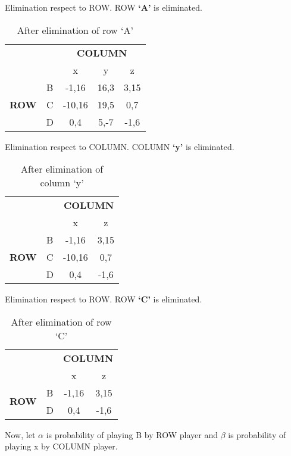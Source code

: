 \documentclass[a4paper,12pt]{article}
\begin{document}
\begin{enumerate}
Elimination respect to ROW. ROW \textbf{`A'} is eliminated.

\begin{table}[h]
\centering
\begin{tabular}{@{}ccccc@{}}
\toprule
\multicolumn{2}{c}{} & \multicolumn{3}{c}{\bfseries COLUMN}\\
\multicolumn{2}{c}{} & x & y & z\\
\multirow{3}{*}{\bfseries ROW} & B & -1,16 & 16,3 & 3,15\\
 & C & -10,16 & 19,5 & 0,7\\
 & D & 0,4 & 5,-7 & -1,6\\
 \bottomrule
\end{tabular}
\caption{After elimination of row `A'}
\end{table}

Elimination respect to COLUMN. COLUMN \textbf{`y'} is eliminated.

\begin{table}[H]
\centering
\begin{tabular}{@{}cccc@{}}
\toprule
\multicolumn{2}{c}{} & \multicolumn{2}{c}{\bfseries COLUMN}\\
\multicolumn{2}{c}{} & x & z\\
\multirow{3}{*}{\bfseries ROW} & B & -1,16 & 3,15\\
 & C & -10,16 & 0,7\\
 & D & 0,4 & -1,6\\
 \bottomrule
\end{tabular}
\caption{After elimination of column `y'}
\end{table}

Elimination respect to ROW. ROW \textbf{`C'} is eliminated.

\begin{table}[H]
\centering
\begin{tabular}{@{}cccc@{}}
\toprule
\multicolumn{2}{c}{} & \multicolumn{2}{c}{\bfseries COLUMN}\\
\multicolumn{2}{c}{} & x & z\\
\multirow{2}{*}{\bfseries ROW} & B & -1,16 & 3,15\\
 & D & 0,4 & -1,6\\
 \bottomrule
\end{tabular}
\caption{After elimination of row `C'}
\end{table}

Now, let $\alpha$ is probability of playing B by ROW player and $\beta$ is probability of playing x by COLUMN player.


\end{enumerate}
\end{document}
